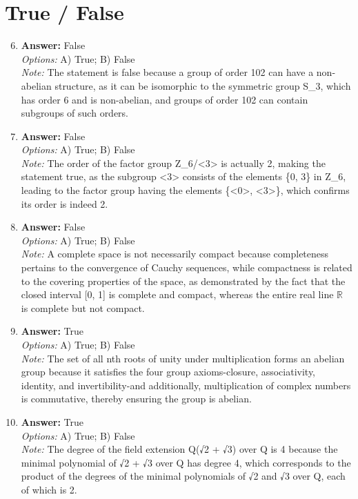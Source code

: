 \documentclass[12pt]{article}
\begin{document}
\section*{True / False}
\begin{enumerate}[label=\arabic*.]
\setcounter{enumi}{5}
\item \textbf{Answer:} False
\\ \textit{Options:} A) True; B) False
\\ \textit{Note:} The statement is false because a group of order 102 can have a non-abelian structure, as it can be isomorphic to the symmetric group S\_3, which has order 6 and is non-abelian, and groups of order 102 can contain subgroups of such orders.
\item \textbf{Answer:} False
\\ \textit{Options:} A) True; B) False
\\ \textit{Note:} The order of the factor group Z\_6/\textless{}3\textgreater{} is actually 2, making the statement true, as the subgroup \textless{}3\textgreater{} consists of the elements \{0, 3\} in Z\_6, leading to the factor group having the elements \{\textless{}0\textgreater{}, \textless{}3\textgreater{}\}, which confirms its order is indeed 2.
\item \textbf{Answer:} False
\\ \textit{Options:} A) True; B) False
\\ \textit{Note:} A complete space is not necessarily compact because completeness pertains to the convergence of Cauchy sequences, while compactness is related to the covering properties of the space, as demonstrated by the fact that the closed interval [0, 1] is complete and compact, whereas the entire real line \(\mathbb{R}\) is complete but not compact.
\item \textbf{Answer:} True
\\ \textit{Options:} A) True; B) False
\\ \textit{Note:} The set of all nth roots of unity under multiplication forms an abelian group because it satisfies the four group axioms-closure, associativity, identity, and invertibility-and additionally, multiplication of complex numbers is commutative, thereby ensuring the group is abelian.
\item \textbf{Answer:} True
\\ \textit{Options:} A) True; B) False
\\ \textit{Note:} The degree of the field extension Q(√2 + √3) over Q is 4 because the minimal polynomial of √2 + √3 over Q has degree 4, which corresponds to the product of the degrees of the minimal polynomials of √2 and √3 over Q, each of which is 2.
\end{enumerate}
\end{document}
